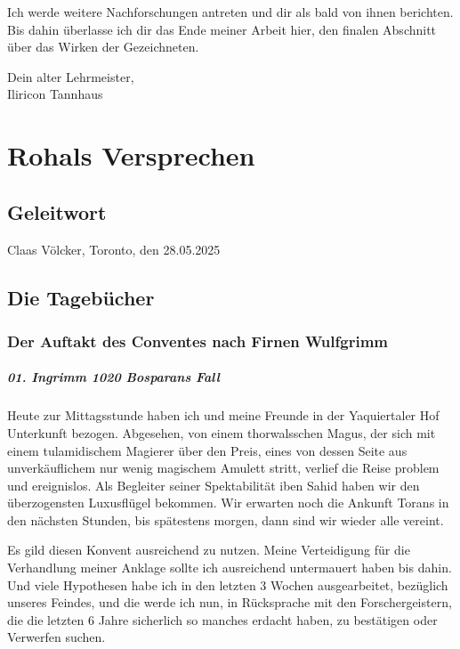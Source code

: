 Ich werde weitere Nachforschungen antreten und dir als bald von ihnen berichten. Bis dahin überlasse ich dir das Ende meiner Arbeit hier, den finalen Abschnitt über das Wirken der Gezeichneten.

Dein alter Lehrmeister,\\
Iliricon Tannhaus

\chapter{Rohals Versprechen}

\section{Geleitwort}


\begin{flushright}
Claas Völcker, Toronto, den 28.05.2025
\end{flushright}


\section{Die Tagebücher}

\subsection{Der Auftakt des Conventes nach Firnen Wulfgrimm}
\paragraph{01. Ingrimm 1020 Bosparans Fall}
Heute zur Mittagsstunde haben ich und meine Freunde in der Yaquiertaler Hof Unterkunft bezogen. Abgesehen, von einem thorwalsschen Magus, der sich mit einem tulamidischem Magierer über den Preis, eines von dessen Seite aus unverkäuflichem nur wenig magischem Amulett stritt, verlief die Reise problem und ereignislos. Als Begleiter seiner Spektabilität iben Sahid haben wir den überzogensten Luxusflügel bekommen. Wir erwarten noch die Ankunft Torans in den nächsten Stunden, bis spätestens morgen, dann sind wir wieder alle vereint.

Es gild diesen Konvent ausreichend zu nutzen. Meine Verteidigung für die Verhandlung meiner Anklage sollte ich ausreichend untermauert haben bis dahin. Und viele Hypothesen habe ich in den letzten 3 Wochen ausgearbeitet, bezüglich unseres Feindes, und die werde ich nun, in Rücksprache mit den Forschergeistern, die die letzten 6 Jahre sicherlich so manches erdacht haben, zu bestätigen oder Verwerfen suchen.


